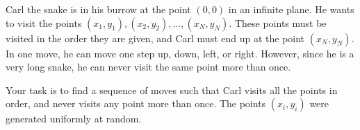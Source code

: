 


Carl the snake is in his burrow at the point $(0,0)$ in an infinite plane. He wants to visit 
the points $(x_1, y_1), (x_2, y_2), \dots, (x_N, y_N)$. These points must be visited in the order they are given,
and Carl must end up at the point $(x_N, y_N)$. In one move, he can move one step up, down, left, or right.
However, since he is a very long snake, he can never visit the same point more than once.

Your task is to find a sequence of moves such that Carl visits all the points in order, and 
never visits any point more than once. The points $(x_i, y_i)$ were generated uniformly at random.


